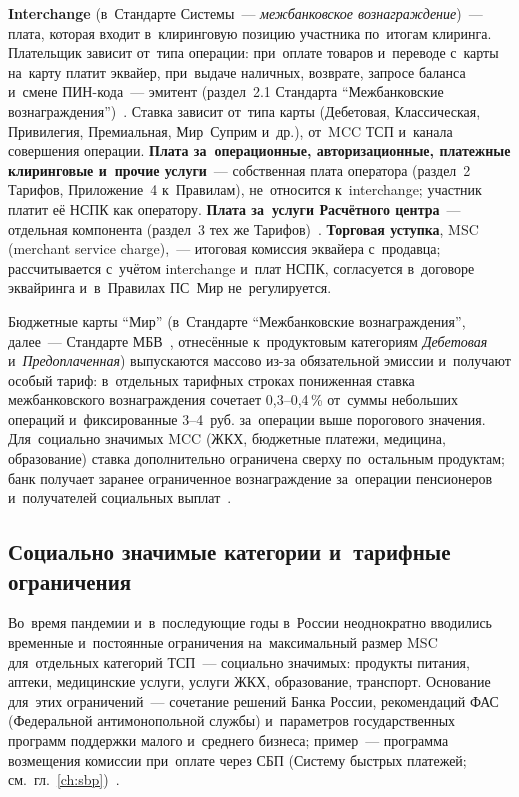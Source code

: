 \textbf{Interchange} (в~Стандарте Системы~--- \emph{межбанковское
вознаграждение})~--- плата, которая входит в~клиринговую позицию участника
по~итогам клиринга. Плательщик зависит от~типа операции: при~оплате товаров
и~переводе с~карты на~карту платит эквайер, при~выдаче наличных, возврате,
запросе баланса и~смене ПИН-кода~--- эмитент (раздел~2.1 Стандарта
\enquote{Межбанковские вознаграждения})~\cite{nspk-mir-irf-v211}. Ставка
зависит от~типа карты (Дебетовая, Классическая, Привилегия, Премиальная,
Мир~Суприм и~др.), от~MCC ТСП и~канала совершения операции. \textbf{Плата
за~операционные, авторизационные, платежные клиринговые и~прочие услуги}~---
собственная плата оператора (раздел~2 Тарифов, Приложение~4 к~Правилам),
не~относится к~interchange; участник платит её НСПК как оператору.
\textbf{Плата за~услуги Расчётного центра}~--- отдельная компонента (раздел~3
тех же Тарифов)~\cite{nspk-mir-tariffs-v414}. \textbf{Торговая уступка}, MSC
(merchant service charge),~--- итоговая комиссия эквайера с~продавца;
рассчитывается с~учётом interchange и~плат НСПК, согласуется в~договоре
эквайринга и~в~Правилах ПС~Мир не~регулируется.

Бюджетные карты \enquote{Мир} (в~Стандарте \enquote{Межбанковские
  вознаграждения}, далее~--- Стандарте МБВ~\cite{nspk-mir-irf-v211}, отнесённые
к~продуктовым категориям \emph{Дебетовая} и~\emph{Предоплаченная}) выпускаются
массово из-за обязательной эмиссии и~получают особый тариф: в~отдельных
тарифных строках пониженная ставка межбанковского вознаграждения сочетает
0,3--0,4\,\% от~суммы небольших операций и~фиксированные 3--4~руб. за~операции
выше порогового значения.
Для~социально значимых MCC (ЖКХ, бюджетные платежи, медицина, образование)
ставка дополнительно ограничена сверху по~остальным продуктам; банк
получает заранее ограниченное вознаграждение за~операции пенсионеров
и~получателей социальных выплат~\cite{cbr-nps-faq,nspk-mir-irf-v211}.

\subsection*{Социально значимые категории и~тарифные ограничения}

Во~время пандемии и~в~последующие годы в~России неоднократно вводились
временные и~постоянные ограничения на~максимальный размер MSC для~отдельных
категорий ТСП~--- социально значимых: продукты питания, аптеки, медицинские
услуги, услуги ЖКХ, образование, транспорт. Основание для~этих ограничений~---
сочетание решений Банка России, рекомендаций ФАС (Федеральной антимонопольной
службы) и~параметров государственных программ поддержки малого и~среднего
бизнеса; пример~--- программа возмещения комиссии при~оплате через
СБП (Систему быстрых платежей;
см.~гл.~\ref{ch:sbp})~\cite{cbr-sme-sbp-subsidy}.

